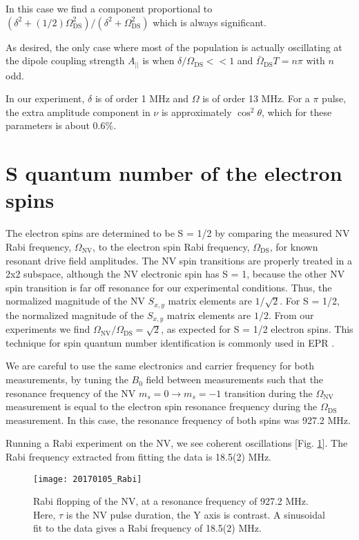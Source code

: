 \documentclass[%
 reprint,
 amsmath,amssymb,
 aps,
]{revtex4-1}
\begin{document}
In this case we find a component proportional to $(\delta^2 + (1/2)\Omega_{\text{DS}}^2)/(\delta^2 + \Omega_{\text{DS}}^2)$ which is always significant.

As desired, the only case where most of the population is actually oscillating at the dipole coupling strength $A_{||}$ is when $\delta/\Omega_{\text{DS}} << 1$ and $\bar \Omega_{\text{DS}} T = n\pi$ with $n$ odd. 

In our experiment, $\delta$ is of order 1 MHz and $\Omega$ is of order 13 MHz. For a $\pi$ pulse, the extra amplitude component in $\nu$ is approximately $\cos^2{\theta}$, which for these parameters is about 0.6$\%$.

\section{S quantum number of the electron spins}

The electron spins are determined to be S = 1/2 by comparing the measured NV Rabi frequency, $\Omega_{\text{NV}}$, to the electron spin Rabi frequency, $\Omega_{\text{DS}}$, for known resonant drive field amplitudes. The NV spin transitions are properly treated in a 2x2 subspace, although the NV electronic spin has S = 1, because the other NV spin transition is far off resonance for our experimental conditions. Thus, the normalized magnitude of the NV $S_{x, y}$ matrix elements are $1/\sqrt{2}$. For S = 1/2, the normalized magnitude of the $S_{x,y}$ matrix elements are $1/2$. From our experiments we find $\Omega_{\text{NV}}/\Omega_{\text{DS}} = \sqrt{2}$, as expected for S = 1/2 electron spins. This technique for spin quantum number identification is commonly used in EPR \cite{schweiger}.

We are careful to use the same electronics and carrier frequency for both measurements, by tuning the $B_{0}$ field between measurements such that the resonance frequency of the NV $m_s = 0 \rightarrow m_s = -1$ transition during the $\Omega_{\text{NV}}$ measurement is equal to the electron spin resonance frequency during the $\Omega_{\text{DS}}$ measurement. In this case, the resonance frequency of both spins was 927.2 MHz. 

Running a Rabi experiment on the NV, we see coherent oscillations [Fig. \ref{NVrabi}]. The Rabi frequency extracted from fitting the data is 18.5(2) MHz. 

\begin{figure}[h!]
\centering
\texttt{[image: 20170105\_Rabi]}
\caption{Rabi flopping of the NV, at a resonance frequency of 927.2 MHz. Here, $\tau$ is the NV pulse duration, the Y axis is contrast. A sinusoidal fit to the data gives a Rabi frequency of 18.5(2) MHz.}
\label{NVrabi}
\end{figure}
\end{document}
